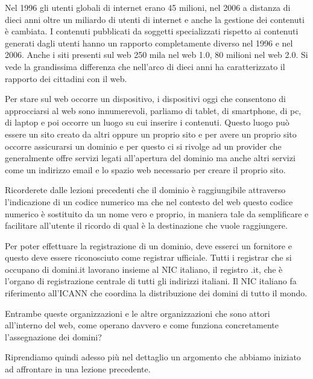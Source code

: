 Nel 1996 gli utenti globali di internet erano 45 milioni, nel 2006 a distanza di dieci anni oltre un miliardo di utenti di internet e anche la gestione dei contenuti è cambiata. I contenuti pubblicati da soggetti specializzati rispetto ai contenuti generati dagli utenti hanno un rapporto completamente diverso nel 1996 e nel 2006. Anche i siti presenti sul web 250 mila nel web 1.0, 80 milioni nel web 2.0. Si vede la grandissima differenza che nell'arco di dieci anni ha caratterizzato il rapporto dei cittadini con il web.\par
Per stare sul web occorre un dispositivo, i dispositivi oggi che consentono di approcciarsi al web sono innumerevoli, parliamo di tablet, di smartphone, di pc, di laptop e poi occorre un luogo su cui inserire i contenuti. Questo luogo può essere un sito creato da altri oppure un proprio sito e per avere un proprio sito occorre assicurarsi un dominio e per questo ci si rivolge ad un provider che generalmente offre servizi legati all'apertura del dominio ma anche altri servizi come un indirizzo email e lo spazio web necessario per creare il proprio sito.\par
Ricorderete dalle lezioni precedenti che il dominio è raggiungibile attraverso l'indicazione di un codice numerico ma che nel contesto del web questo codice numerico è sostituito da un nome vero e proprio, in maniera tale da semplificare e facilitare all'utente il ricordo di qual è la destinazione che vuole raggiungere.\par
Per poter effettuare la registrazione di un dominio, deve esserci un fornitore e questo deve essere riconosciuto come registrar ufficiale. Tutti i registrar che si occupano di domini.it lavorano insieme al NIC italiano, il registro .it, che è l'organo di registrazione centrale di tutti gli indirizzi italiani. Il NIC italiano fa riferimento all'ICANN che coordina la distribuzione dei domini di tutto il mondo.\par
Entrambe queste organizzazioni e le altre organizzazioni che sono attori all'interno del web, come operano davvero e come funziona concretamente l'assegnazione dei domini?\par
Riprendiamo quindi adesso più nel dettaglio un argomento che abbiamo iniziato ad affrontare in una lezione precedente.\par
